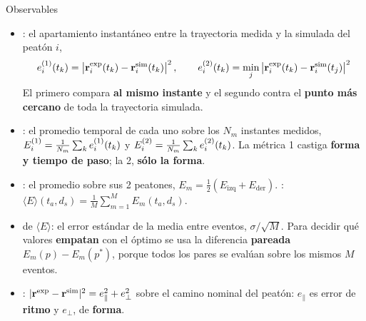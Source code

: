 \documentclass[aspectratio=169,11pt]{beamer}
\begin{document}
\begin{frame}{Observables}
    \vspace{-0.3em}
    \footnotesize
    \setlength{\abovedisplayskip}{4pt}\setlength{\belowdisplayskip}{4pt}
    \begin{itemize}\setlength{\itemsep}{0.45em}
        \item {}: el apartamiento instantáneo entre la
              trayectoria medida y la simulada del peatón $i$,
              \[
                e^{(1)}_i(t_k) = \left|\mathbf{r}_i^{\text{exp}}(t_k) - \mathbf{r}_i^{\text{sim}}(t_k)\right|^2,
                \qquad
                e^{(2)}_i(t_k) = \min_j \left|\mathbf{r}_i^{\text{exp}}(t_k) - \mathbf{r}_i^{\text{sim}}(t_j)\right|^2
              \]
              El primero compara \textbf{al mismo instante} y el segundo contra el
              \textbf{punto más cercano} de toda la trayectoria simulada.
        \item {}: el promedio temporal de cada uno sobre
              los $N_m$ instantes medidos,
              $E^{(1)}_i = \frac{1}{N_m}\sum_k e^{(1)}_i(t_k)$ y
              $E^{(2)}_i = \frac{1}{N_m}\sum_k e^{(2)}_i(t_k)$. La métrica 1 castiga
              \textbf{forma y tiempo de paso}; la 2, \textbf{sólo la forma}.
        \item {}: el promedio sobre sus 2 peatones,
              $E_m = \tfrac{1}{2}(E_{\text{izq}} + E_{\text{der}})$.
              : $\langle E \rangle (t_a,d_s) =
              \frac{1}{M}\sum_{m=1}^{M} E_m(t_a,d_s)$.
        \item {} de $\langle E \rangle$: el error estándar de
              la media entre eventos, $\sigma/\sqrt{M}$. Para decidir qué valores
              \textbf{empatan} con el óptimo se usa la diferencia \textbf{pareada}
              $E_m(p) - E_m(p^{*})$, porque todos los pares se evalúan sobre los
              mismos $M$ eventos.
        \item {}:
              $|\mathbf{r}^{\text{exp}} - \mathbf{r}^{\text{sim}}|^2 = e_{\parallel}^2 + e_{\perp}^2$
              sobre el camino nominal del peatón: $e_{\parallel}$ es error de
              \textbf{ritmo} y $e_{\perp}$, de \textbf{forma}.
    \end{itemize}
\end{frame}
\end{document}
